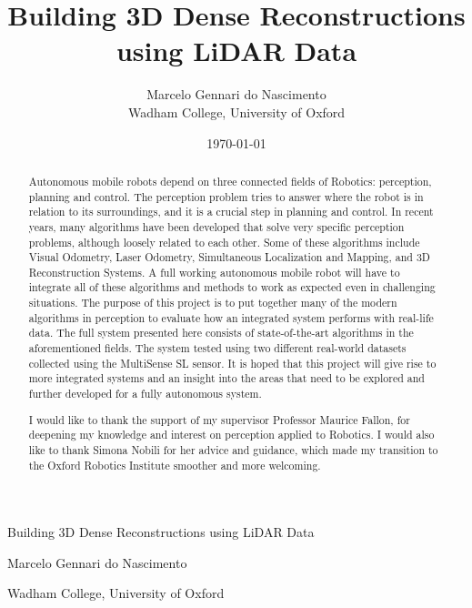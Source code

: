 \documentclass[11pt]{article}
\title{Building 3D Dense Reconstructions using LiDAR Data}
\author{Marcelo Gennari do Nascimento \\ Wadham College, University of Oxford}
\date{\today}
\begin{document}

	\maketitle

	
	\clearpage
	\newpage
	
	\newpage
	\begin{center}
		Building 3D Dense Reconstructions using LiDAR Data
	\end{center}
	\begin{center}
		\vspace{-20pt}
		Marcelo Gennari do Nascimento
	\end{center}
	\begin{center}
		\vspace{-20pt}
		Wadham College, University of Oxford
	\end{center}
	\begin{abstract}
		
		Autonomous mobile robots depend on three connected fields of Robotics: perception, planning and control. The perception problem tries to answer where the robot is in relation to its surroundings, and it is a crucial step in planning and control.
		In recent years, many algorithms have been developed that solve very specific perception problems, although loosely related to each other. Some of these algorithms include Visual Odometry, Laser Odometry, Simultaneous Localization and Mapping, and 3D Reconstruction Systems.
		A full working autonomous mobile robot will have to integrate all of these algorithms and methods to work as expected even in challenging situations.
		The purpose of this project is to put together many of the modern algorithms in perception to evaluate how an integrated system performs with real-life data. The full system presented here consists of state-of-the-art algorithms in the aforementioned fields. The system tested using two different real-world datasets collected using the MultiSense SL sensor.
		It is hoped that this project will give rise to more integrated systems and an insight into the areas that need to be explored and further developed for a fully autonomous system.
	\end{abstract}

	\renewcommand{\abstractname}{Acknowledgements}
	\begin{abstract}
		I would like to thank the support of my supervisor Professor Maurice Fallon, for deepening my knowledge and interest on perception applied to Robotics. I would also like to thank Simona Nobili for her advice and guidance, which made my transition to the Oxford Robotics Institute smoother and more welcoming.
	\end{abstract}
\end{document}
